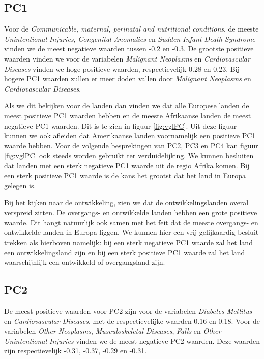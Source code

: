 \documentclass[a4paper,kulak]{kulakarticle}
\begin{document}
\subsection{PC1}
Voor de \textit{Communicable, maternal, perinatal and nutritional conditions}, de meeste \textit{Unintentional Injuries}, \textit{Congenital Anomalies} en \textit{Sudden Infant Death Syndrome} vinden we de meest negatieve waarden tussen -0.2 en -0.3. De grootste positieve waarden vinden we voor de variabelen \textit{Malignant Neoplasms} en \textit{Cardiovascular Diseases} vinden we hoge positieve waarden, respectievelijk 0.28 en 0.23. Bij hogere PC1 waarden zullen er meer doden vallen door \textit{Malignant Neoplasms} en \textit{Cardiovascular Diseases}.

Als we dit bekijken voor de landen dan vinden we dat alle Europese landen de meest positieve PC1 waarden hebben en de meeste Afrikaanse landen de meest negatieve PC1 waarden. Dit is te zien in figuur \ref{fig:vglPC}. Uit deze figuur kunnen we ook afleiden dat Amerikaanse landen voornamelijk een positieve PC1 waarde hebben. Voor de volgende besprekingen van PC2, PC3 en PC4 kan figuur \ref{fig:vglPC} ook steeds worden gebruikt ter verduidelijking. We kunnen besluiten dat landen met een sterk negatieve PC1 waarde uit de regio Afrika komen. Bij een sterk positieve PC1 waarde is de kans het grootst dat het land in Europa gelegen is. 

Bij het kijken naar de ontwikkeling, zien we dat de ontwikkelingslanden overal verspreid zitten. De overgangs- en ontwikkelde landen hebben een grote positieve waarde. Dit hangt natuurlijk ook samen met het feit dat de meeste overgangs- en ontwikkelde landen in Europa liggen. We kunnen hier een vrij gelijkaardig besluit trekken als hierboven namelijk: bij een sterk negatieve PC1 waarde zal het land een ontwikkelingsland zijn en bij een sterk positieve PC1 waarde zal het land waarschijnlijk een ontwikkeld of overgangsland zijn.



\subsection{PC2}
De meest positieve waarden voor PC2 zijn voor de variabelen \textit{Diabetes Mellitus} en \textit{Cardiovascular Diseases}, met de respectievelijke waarden 0.16 en 0.18. Voor de variabelen \textit{Other Neoplasms}, \textit{Musculoskeletal Diseases}, \textit{Falls} en \textit{Other Unintentional Injuries} vinden we de meest negatieve PC2 waarden. Deze waarden zijn respectievelijk -0.31, -0.37, -0.29 en -0.31. 
\end{document}
